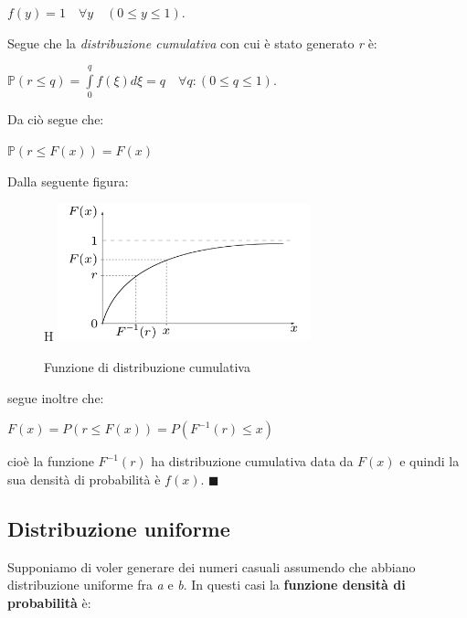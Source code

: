\documentclass[11pt, oneside]{book}
\begin{document}
\begin{center}
 $f(y) = 1 \quad \forall y \quad (0 \leq y \leq 1)$.
\end{center}

Segue che la {\em distribuzione cumulativa} con cui \`e stato generato
{\em r} \`e: 

\begin{center}
$\mathbb{P}(r \leq q) = \int\limits_{0}^{q} f(\xi)d\xi =
q \quad \forall q : (0 \leq q \leq 1)$. 
\end{center}

Da ci\`o segue che:

\begin{center}
 $\mathbb{P}(r \leq F(x)) = F(x)$
\end{center}

Dalla seguente figura:

\begin{figure}{H}
  \centering
  \includegraphics[width=0.65\textwidth]{images/cap11fig1.png}
  \caption{Funzione di distribuzione cumulativa}
  \label{cap11fig1}
\end{figure}

segue inoltre che:

\begin{center}
$F(x) = P(r \leq F(x)) = P(F^{-1}(r) \leq x)$  
\end{center}

cio\`e la funzione $F^{-1}(r)$ ha distribuzione cumulativa data da
$F(x)$ e quindi la sua densit\`a di probabilit\`a \`e
$f(x)$. $\blacksquare$

\par\bigskip

\subsection{Distribuzione uniforme}

Supponiamo di voler generare dei numeri casuali assumendo che abbiano
distribuzione uniforme fra {\em a} e {\em b}. In questi casi la {\bf
  funzione densit\`a di probabilit\`a} \`e:
\end{document}
